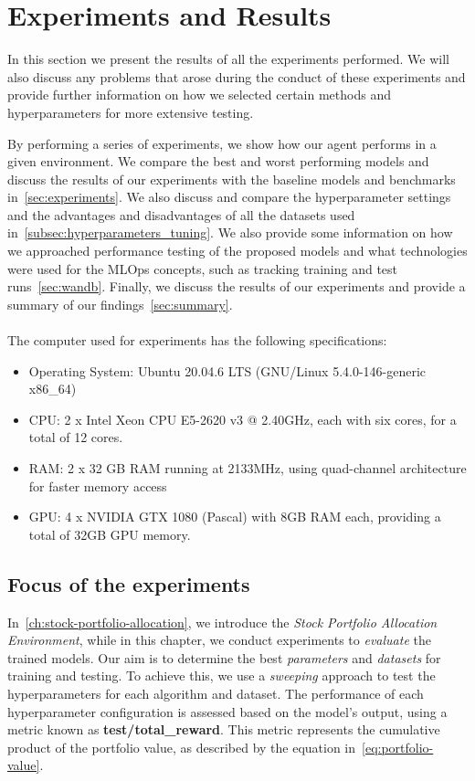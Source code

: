 \documentclass[../xlapes02]{subfiles}
\begin{document}
    \chapter{Experiments and Results}\label{ch:experiments-and-results}
    In this section we present the results of all the experiments performed. We will also discuss any problems that arose during the conduct of these experiments and provide further information on how we selected certain methods and hyperparameters for more extensive testing.

    By performing a series of experiments, we show how our agent performs in a given environment. We compare the best and worst performing models and discuss the results of our experiments with the baseline models and benchmarks in~\cref{sec:experiments}. We also discuss and compare the hyperparameter settings and the advantages and disadvantages of all the datasets used in~\cref{subsec:hyperparameters_tuning}. We also provide some information on how we approached performance testing of the proposed models and what technologies were used for the MLOps concepts, such as tracking training and test runs~\cref{sec:wandb}. Finally, we discuss the results of our experiments and provide a summary of our findings~\cref{sec:summary}.
    \\
    \\
    The computer used for experiments has the following specifications:
    \begin{itemize}
        \item Operating System: Ubuntu 20.04.6 LTS (GNU/Linux 5.4.0-146-generic x86\_64)
        \item CPU: 2 x Intel Xeon CPU E5-2620 v3 @ 2.40GHz, each with six cores, for a total of 12 cores.
        \item RAM: 2 x 32 GB RAM running at 2133MHz, using quad-channel architecture for faster memory access
        \item GPU: 4 x NVIDIA GTX 1080 (Pascal) with 8GB RAM each, providing a total of 32GB GPU memory.
    \end{itemize}


    \section{Focus of the experiments}\label{sec:focus-of-the-experiments}
    In~\cref{ch:stock-portfolio-allocation}, we introduce the \emph{Stock Portfolio Allocation Environment}, while in this chapter, we conduct experiments to \emph{evaluate} the trained models. Our aim is to determine the best \emph{parameters} and \emph{datasets} for training and testing. To achieve this, we use a \emph{sweeping} approach to test the hyperparameters for each algorithm and dataset. The performance of each hyperparameter configuration is assessed based on the model's output, using a metric known as \textbf{test/total\_reward}. This metric represents the cumulative product of the portfolio value, as described by the equation in~\cref{eq:portfolio-value}.
\end{document}
